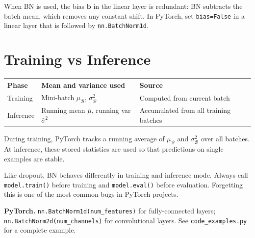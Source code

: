 \documentclass[12pt, a4paper]{article}
\theoremstyle{definition}
\newcommand{\muB}{\mu_{\mathcal{B}}}
\newcommand{\sigB}{\sigma^2_{\mathcal{B}}}
\begin{document}
\begin{notebox}
When BN is used, the bias $\mathbf{b}$ in the linear layer is redundant:
BN subtracts the batch mean, which removes any constant shift.
In PyTorch, set \texttt{bias=False} in a linear layer that is followed by
\texttt{nn.BatchNorm1d}.
\end{notebox}

\section{Training vs Inference}

\begin{center}
\renewcommand{\arraystretch}{1.3}
\begin{tabular}{lll}
\toprule
Phase & Mean and variance used & Source \\
\midrule
Training   & Mini-batch $\muB$, $\sigB$ & Computed from current batch \\
Inference  & Running mean $\bar\mu$, running var $\bar\sigma^2$ &
             Accumulated from all training batches \\
\bottomrule
\end{tabular}
\end{center}

During training, PyTorch tracks a running average of $\muB$ and $\sigB$
over all batches.  At inference, these stored statistics are used so that
predictions on single examples are stable.

\begin{warnbox}
Like dropout, BN behaves differently in training and inference mode.
Always call \texttt{model.train()} before training and
\texttt{model.eval()} before evaluation.
Forgetting this is one of the most common bugs in PyTorch projects.
\end{warnbox}

\begin{notebox}
\textbf{PyTorch.}
\texttt{nn.BatchNorm1d(num\_features)} for fully-connected layers;
\texttt{nn.BatchNorm2d(num\_channels)} for convolutional layers.
See \texttt{code\_examples.py} for a complete example.
\end{notebox}
\end{document}

